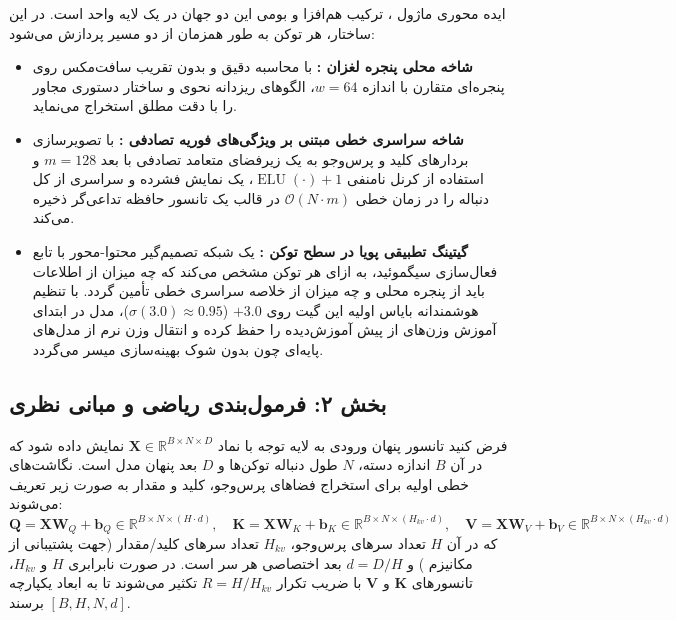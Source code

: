 ایده محوری ماژول ، ترکیب هم‌افزا و بومی  این دو جهان در یک لایه واحد است. در این ساختار، هر توکن به طور همزمان از دو مسیر پردازش می‌شود:
\begin{itemize}
    \item \textbf{شاخه محلی پنجره لغزان :} با محاسبه دقیق و بدون تقریب سافت‌مکس روی پنجره‌ای متقارن با اندازه $w=64$، الگوهای ریزدانه نحوی و ساختار دستوری مجاور را با دقت مطلق استخراج می‌نماید.
    \item \textbf{شاخه سراسری خطی مبتنی بر ویژگی‌های فوریه تصادفی :} با تصویرسازی بردارهای کلید و پرس‌وجو به یک زیرفضای متعامد تصادفی با بعد $m=128$ و استفاده از کرنل نامنفی $\operatorname{ELU}(\cdot)+1$، یک نمایش فشرده و سراسری از کل دنباله را در زمان خطی $\mathcal{O}(N \cdot m)$ در قالب یک تانسور حافظه تداعی‌گر ذخیره می‌کند.
    \item \textbf{گیتینگ تطبیقی پویا در سطح توکن :} یک شبکه تصمیم‌گیر محتوا-محور با تابع فعال‌سازی سیگموئید، به ازای هر توکن مشخص می‌کند که چه میزان از اطلاعات باید از پنجره محلی و چه میزان از خلاصه سراسری خطی تأمین گردد. با تنظیم هوشمندانه بایاس اولیه این گیت روی $+3.0$ ($\sigma(3.0) \approx 0.95$)، مدل در ابتدای آموزش وزن‌های از پیش آموزش‌دیده را حفظ کرده و انتقال وزن نرم از مدل‌های پایه‌ای چون  بدون شوک بهینه‌سازی میسر می‌گردد.
\end{itemize}

\subsection*{بخش ۲: فرمول‌بندی ریاضی و مبانی نظری }
فرض کنید تانسور پنهان ورودی به لایه توجه با نماد $\mathbf{X} \in \mathbb{R}^{B \times N \times D}$ نمایش داده شود که در آن $B$ اندازه دسته، $N$ طول دنباله توکن‌ها و $D$ بعد پنهان مدل است. نگاشت‌های خطی اولیه برای استخراج فضاهای پرس‌وجو، کلید و مقدار به صورت زیر تعریف می‌شوند:
\begin{equation}
\mathbf{Q} = \mathbf{X}\mathbf{W}_Q + \mathbf{b}_Q \in \mathbb{R}^{B \times N \times (H \cdot d)}, \quad
\mathbf{K} = \mathbf{X}\mathbf{W}_K + \mathbf{b}_K \in \mathbb{R}^{B \times N \times (H_{kv} \cdot d)}, \quad
\mathbf{V} = \mathbf{X}\mathbf{W}_V + \mathbf{b}_V \in \mathbb{R}^{B \times N \times (H_{kv} \cdot d)}
\end{equation}
که در آن $H$ تعداد سرهای پرس‌وجو، $H_{kv}$ تعداد سرهای کلید/مقدار (جهت پشتیبانی از مکانیزم ) و $d = D/H$ بعد اختصاصی هر سر است. در صورت نابرابری $H$ و $H_{kv}$، تانسورهای $\mathbf{K}$ و $\mathbf{V}$ با ضریب تکرار $R = H / H_{kv}$ تکثیر می‌شوند تا به ابعاد یکپارچه $[B, H, N, d]$ برسند.


